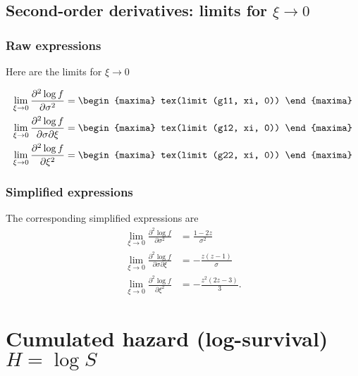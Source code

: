 \subsection{Second-order derivatives: limits for $\xi \to 0$}

\subsubsection*{Raw expressions} 

Here are the limits for $\xi \to 0$

{\color{MonVertF}
\begin{align*}
\lim_{\xi \to 0} \frac{\partial^2 \log f}{\partial \sigma^2} &=
\begin{maxima}
tex(limit (g11, xi, 0))
\end{maxima} \\
\lim_{\xi \to 0} \frac{\partial^2 \log f}{\partial \sigma \partial \xi} &=
\begin{maxima}
tex(limit (g12, xi, 0))
\end{maxima} \\
\lim_{\xi \to 0} \frac{\partial^2 \log f}{\partial \xi^2} &=
\begin{maxima}
tex(limit (g22, xi, 0))
\end{maxima}
\end{align*}}

\subsubsection*{Simplified expressions} 

The corresponding simplified expressions are
{\color{red}
\begin{align*}
\lim_{\xi \to 0} \frac{\partial^2 \log f}{\partial \sigma^2} &=
\frac{1-2z}{\sigma^2}\\
\lim_{\xi \to 0} \frac{\partial^2 \log f}{\partial \sigma \partial \xi} &=
- \frac{z (z - 1)}{\sigma}\\
\lim_{\xi \to 0} \frac{\partial^2 \log f}{\partial \xi^2} &= 
- \frac{z^2 (2 z - 3)}{3}.
\end{align*}
}

\section{Cumulated hazard (log-survival) $H = \log S$}

